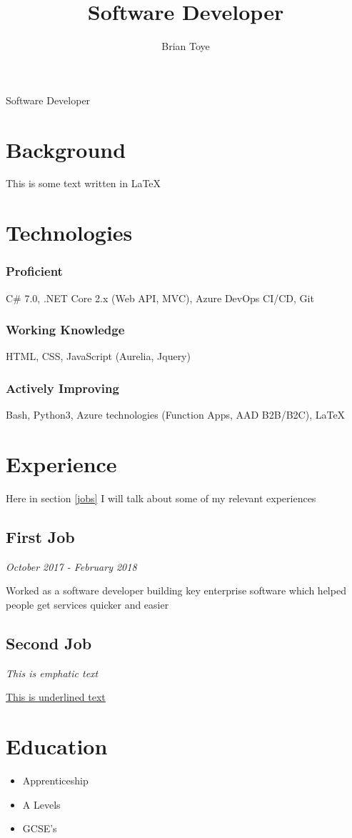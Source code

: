 \documentclass{article}
\author{Brian Toye}
\title{Software Developer}
\renewcommand{\maketitle}{
\begin{center}
{\huge\bfseries
\theauthor}

\vspace{.25em}

Software Developer
\end{center}
}
\begin{document}
\maketitle

\section{Background}

This is some text written in {\LaTeX}

\section{Technologies}

\subsubsection{Proficient}
C\# 7.0, .NET Core 2.x (Web API, MVC), Azure DevOps CI/CD, Git

\subsubsection{Working Knowledge}
HTML, CSS, JavaScript (Aurelia, Jquery)

\subsubsection{Actively Improving}
Bash, Python3, Azure technologies (Function Apps, AAD B2B/B2C), {\LaTeX}

\section{Experience\label{jobs}}

Here in section \ref{jobs} I will talk about some of my relevant experiences

\subsection{First Job}

\textit {October 2017 - February 2018}

Worked as a software developer building key enterprise software which helped people get services quicker and easier

\subsection{Second Job}

\emph{This is emphatic text}

\underline{This is underlined text}

\section{Education}

\begin{itemize}
\item Apprenticeship
\item A Levels
\item GCSE's
\end{itemize}
\end{document}
